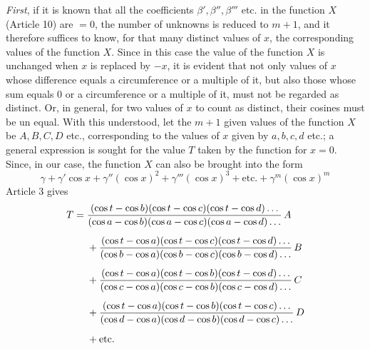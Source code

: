 \textit{First}, if it is known that all the coefficients \(\beta',\beta'',\beta'''\) etc. in the function \(X\) (Article 10) are \(=0\), the number of unknowns is reduced to \(m+1\), and it therefore suffices to know, for that many distinct values of \(x\), the corresponding values of the function \(X\). Since in this case the value of the function \(X\) is unchanged when \(x\) is replaced by \(-x\), it is evident that not only values of \(x\) whose difference equals a circumference or a multiple of it, but also those whose sum equals \(0\) or a circumference or a multiple of it, must not be regarded as distinct. Or, in general, for two values of \(x\) to count as distinct, their cosines must be un%
equal. With this understood, let the \(m+1\) given values of the function \(X\) be \(A, B, C, D\) etc., corresponding to the values of \(x\) given by \(a, b, c, d\) etc.; a general expression is sought for the value \(T\) taken by the function for \(x=0\).
Since, in our case, the function \(X\) can also be brought into the form
\[
\gamma+\gamma'\cos x+\gamma''(\cos x)^2+\gamma'''(\cos x)^3+\text{etc.}+\gamma^m(\cos x)^m
\]
Article 3 gives
\[
\begin{aligned}
T={}&\frac{(\cos t-\cos b)(\cos t-\cos c)(\cos t-\cos d)\mathinner{.\,.\,.}}{(\cos a-\cos b)(\cos a-\cos c)(\cos a-\cos d)\mathinner{.\,.\,.}}\,A\\[5pt]
&+\frac{(\cos t-\cos a)(\cos t-\cos c)(\cos t-\cos d)\mathinner{.\,.\,.}}{(\cos b-\cos a)(\cos b-\cos c)(\cos b-\cos d)\mathinner{.\,.\,.}}\,B\\[5pt]
&+\frac{(\cos t-\cos a)(\cos t-\cos b)(\cos t-\cos d)\mathinner{.\,.\,.}}{(\cos c-\cos a)(\cos c-\cos b)(\cos c-\cos d)\mathinner{.\,.\,.}}\,C\\[5pt]
&+\frac{(\cos t-\cos a)(\cos t-\cos b)(\cos t-\cos c)\mathinner{.\,.\,.}}{(\cos d-\cos a)(\cos d-\cos b)(\cos d-\cos c)\mathinner{.\,.\,.}}\,D\\[5pt]
&+\text{etc.}
\end{aligned}
\]

